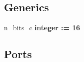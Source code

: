 \subsection*{Generics}
 \begin{DoxyCompactItemize}
\item 
\hyperlink{classcomparador_afee4aa1628956aa350183d8881689198}{n\+\_\+bits\+\_\+c} {\bfseries {\bfseries \textcolor{comment}{integer}\textcolor{vhdlchar}{ }\textcolor{vhdlchar}{ }\textcolor{vhdlchar}{\+:}\textcolor{vhdlchar}{=}\textcolor{vhdlchar}{ }\textcolor{vhdlchar}{ } \textcolor{vhdldigit}{16} \textcolor{vhdlchar}{ }}}
\end{DoxyCompactItemize}
\subsection*{Ports}

